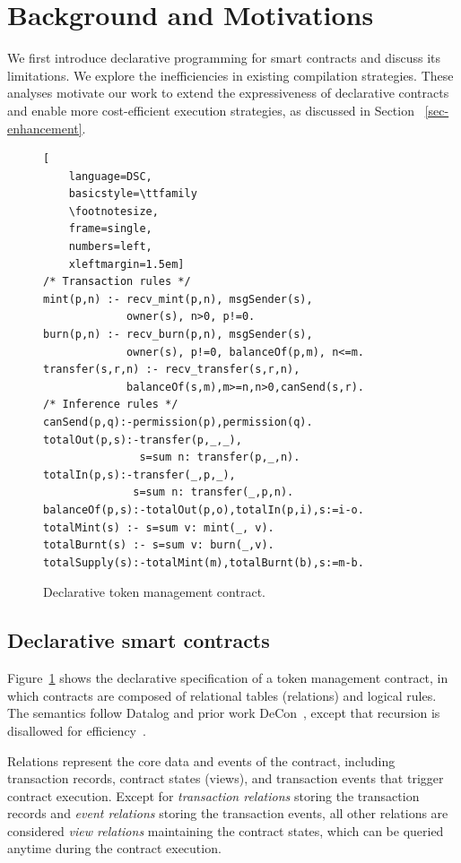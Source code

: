 \section{Background and Motivations}
\label{sec-motivation}

We first introduce declarative programming for smart contracts and discuss its limitations. We explore the inefficiencies in existing compilation strategies. These analyses motivate our work to extend the expressiveness of declarative contracts and enable more cost-efficient execution strategies, as discussed in Section ~\ref{sec-enhancement}.

\begin{figure}[t]
    \centering
    \begin{lstlisting}[
    language=DSC,
    basicstyle=\ttfamily
    \footnotesize,
    frame=single,
    numbers=left,
    xleftmargin=1.5em]
/* Transaction rules */
mint(p,n) :- recv_mint(p,n), msgSender(s), 
             owner(s), n>0, p!=0.
burn(p,n) :- recv_burn(p,n), msgSender(s), 
             owner(s), p!=0, balanceOf(p,m), n<=m.
transfer(s,r,n) :- recv_transfer(s,r,n), 
             balanceOf(s,m),m>=n,n>0,canSend(s,r). 
/* Inference rules */
canSend(p,q):-permission(p),permission(q). 
totalOut(p,s):-transfer(p,_,_), 
               s=sum n: transfer(p,_,n).
totalIn(p,s):-transfer(_,p,_), 
              s=sum n: transfer(_,p,n).
balanceOf(p,s):-totalOut(p,o),totalIn(p,i),s:=i-o.
totalMint(s) :- s=sum v: mint(_, v).
totalBurnt(s) :- s=sum v: burn(_,v).
totalSupply(s):-totalMint(m),totalBurnt(b),s:=m-b.
    \end{lstlisting}
    \vspace{-1.2em}
    \caption{Declarative token management contract.}
    \label{fig-example}
\vspace{-1.5em}
\end{figure}

\subsection{Declarative smart contracts}

Figure~\ref{fig-example} shows the declarative specification of a token management
contract, in which contracts are composed of relational tables (relations) and logical rules. The semantics follow Datalog and prior work DeCon~\cite{chen2022declarative}, except that recursion is disallowed for efficiency~\cite{chen2022synthesis}.

Relations represent the core data and events of the contract, including transaction records, contract states (views), and transaction events that trigger contract execution. 
Except for \emph{transaction relations} storing the transaction records and \emph{event relations} storing the transaction events, all other relations are considered \emph{view relations} maintaining the contract states, which can be queried anytime during the contract execution.

